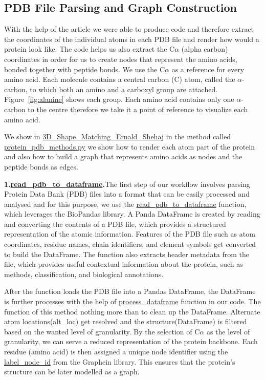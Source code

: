\documentclass[\reportLanguage, twocolumn, 11pt]{article}
\begin{document}
\subsection{PDB File Parsing and Graph Construction}
With the help of the article \cite{brasier_pdb_medium} we were able to produce code and therefore extract the coordinates of the individual atoms in each PDB file and render how would a protein look like. The code helps us also extract the C$\alpha$ (alpha carbon) coordinates in order for us to create nodes that represent the amino acids, bonded together with peptide bonds. We use the C$\alpha$ as a reference for every amino acid. Each molecule contains a central carbon (C) atom, called the $\alpha$-carbon, to which both an amino and a carboxyl group are attached. Figure~\ref{fig:alanine} shows each group. Each amino acid contains only one $\alpha$-carbon to the centre therefore we take it a point of reference to visualize each amino acid. 

We show in \url{3D_Shape_Matching_Ernald_Shehaj}\cite{shehaj2025} in the method called \url{protein_pdb_methods.py} we show how to render each atom part of the protein and also how to build a graph that represents amino acids as nodes and the peptide bonds as edges.

\textbf{1.\url{read_pdb_to_dataframe}.}The first step of our workflow involves parsing Protein Data Bank (PDB) files into a format that can be easily processed and analysed and for this purpose, we use the \url{read_pdb_to_dataframe} function, which leverages the BioPandas library. A Panda DataFrame is created by reading and converting the contents of a PDB file, which provides a structured representation of the atomic information. Features of the PDB file such as atom coordinates, residue names, chain identifiers, and element symbols get converted to build the DataFrame. The function also extracts header metadata from the file, which provides useful contextual information about the protein, such as methods, classification, and biological annotations. 

After the function loads the PDB file into a Pandas DataFrame, the DataFrame is further processes with the help of \url{process_dataframe} function in our code. The function of this method nothing more than to clean up the DataFrame. Alternate atom locations(alt\_loc) get resolved and the structure(DataFrame) is filtered based on the wanted level of granularity. By the selection of C$\alpha$ as the level of granularity, we can serve a reduced representation of the protein backbone. Each residue (amino acid) is then assigned a unique node identifier using the \url{label_node_id} from the Graphein library. This ensures that the protein's structure can be later modelled as a graph. 
\end{document}
